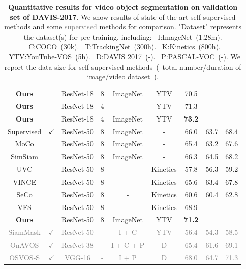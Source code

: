 \documentclass{article}
\begin{document}
\begin{table}[t]
{\begin{tabular}{ccccccccc}
      \textbf{Ours} & & ResNet-18 & 8 & ImageNet & YTV
			& 70.5   & & \\
      \textbf{Ours} & & ResNet-18 & 4 & - & YTV
			& 71.3    & & \\
      \textbf{Ours} & & ResNet-18 & 4 & ImageNet & YTV
			& \textbf{73.2}   & &  \\
			\hline
      \hline
      Supervised & $\checkmark$& ResNet-50 & 8 & ImageNet &-
			& 66.0 & 63.7  & 68.4  \\
      MoCo & & ResNet-50 & 8 & ImageNet &-
			& 65.4 & 63.2  & 67.6  \\
      SimSiam & & ResNet-50 & 8 & ImageNet &-
			& 66.3 & 64.5  & 68.2  \\
      UVC  & & ResNet-50 & 8 & - & Kinetics
			& 57.8 & 56.3  & 59.2  \\
      VINCE & & ResNet-50 & 8 & - & Kinetics
			& 65.6 & 63.4  & 67.8  \\
      SeCo & & ResNet-50 & 8 & - & Kinetics
			& 60.6 & 60.4  & 62.8  \\
      VFS  & & ResNet-50 & 8 & - & Kinetics
			& 68.9     \\
      \hline
      \textbf{Ours} & & ResNet-50 & 8 & ImageNet & YTV
			& \textbf{71.2}   & &  \\
      \hline
      \textcolor{gray}{SiamMask} & \textcolor{gray}{$\checkmark$} & \textcolor{gray}{ResNet-50} & \textcolor{gray}{-} & \textcolor{gray}{I + C} & \textcolor{gray}{YTV}
			& \textcolor{gray}{56.4} & \textcolor{gray}{54.3}  & \textcolor{gray}{58.5}  \\
      \textcolor{gray}{OnAVOS} & \textcolor{gray}{$\checkmark$} & \textcolor{gray}{ResNet-38} & \textcolor{gray}{-} & \textcolor{gray}{I + C + P} & \textcolor{gray}{D}
			& \textcolor{gray}{65.4} & \textcolor{gray}{61.6}  & \textcolor{gray}{69.1}  \\
      \textcolor{gray}{OSVOS-S}  & \textcolor{gray}{$\checkmark$} & \textcolor{gray}{VGG-16} & \textcolor{gray}{-} & \textcolor{gray}{I + P} & \textcolor{gray}{D}
			& \textcolor{gray}{68.0}   & \textcolor{gray}{64.7} & \textcolor{gray}{71.3}  \\
			\bottomrule
		\end{tabular}
	}
	\captionsetup{font=footnotesize}
	\caption{\textbf{Quantitative results for video object segmentation on validation set of DAVIS-2017}. We show results of state-of-the-art self-supervised methods and some \textcolor{gray}{supervised} methods for comparison. "Dataset" represents the dataset(s) for pre-training, including: ~I:ImageNet~(1.28m). ~C:COCO~(30k). ~T:TrackingNet~(300h). ~K:Kinetics~(800h). ~YTV:YouTube-VOS~(5h). ~D:DAVIS 2017~(-). ~P:PASCAL-VOC~(-). We report the data size for self-supervised methods~(~total number/duration of image/video dataset~).}
	\label{table:sota}
	\vspace{-29pt}
\end{table}
\end{document}
